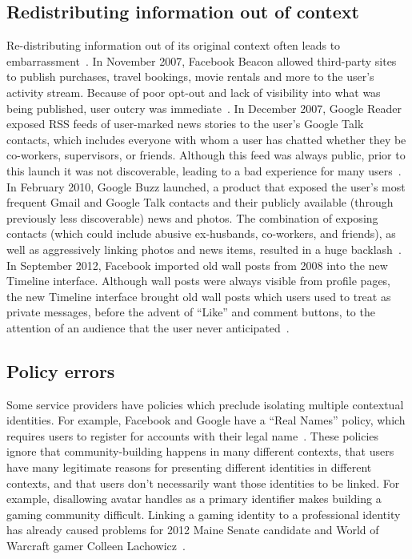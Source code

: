 \documentclass[10pt, conference, compsocconf]{IEEEtran}
\begin{document}
\subsection{Redistributing information out of context}
Re-distributing information out of its original context often leads to
embarrassment~\cite{nissenbaum}.  In November 2007, Facebook Beacon allowed
third-party sites to publish purchases, travel bookings, movie rentals and more
to the user's activity stream.  Because of poor opt-out and lack of visibility
into what was being published, user outcry was
immediate~\cite{mccarthy,nakashima}.  In December 2007, Google Reader exposed
RSS feeds of user-marked news stories to the user's Google Talk contacts, which
includes everyone with whom a user has chatted whether they be co-workers,
supervisors, or friends. Although this feed was always public, prior to this
launch it was not discoverable, leading to a bad experience for many
users~\cite{helft}. In February 2010, Google Buzz launched, a product that
exposed the user's most frequent Gmail and Google Talk contacts and their
publicly available (through previously less discoverable) news and photos.  The
combination of exposing contacts (which could include abusive ex-husbands,
co-workers, and friends), as well as aggressively linking photos and news
items, resulted in a huge backlash~\cite{fugitivus,buzz}. In September 2012,
Facebook imported old wall posts from 2008 into the new Timeline interface.
Although wall posts were always visible from profile pages, the new Timeline
interface brought old wall posts which users used to treat as private messages,
before the advent of ``Like'' and comment buttons, to the attention of an
audience that the user never anticipated~\cite{timeline}.

\subsection{Policy errors}
\label{sec:policies}
Some service providers have policies which preclude isolating multiple
contextual identities. For example, Facebook and Google have a ``Real Names''
policy, which requires users to register for accounts with their legal
name~\cite{fb_names,google_names}.  These policies ignore that
community-building happens in many different contexts, that users have many
legitimate reasons for presenting different identities in different contexts,
and that users don't necessarily want those identities to be linked. For
example, disallowing avatar handles as a primary identifier makes building a
gaming community difficult.  Linking a gaming identity to a professional
identity has already caused problems for 2012 Maine Senate candidate and World
of Warcraft gamer Colleen Lachowicz~\cite{maine}.
\end{document}
